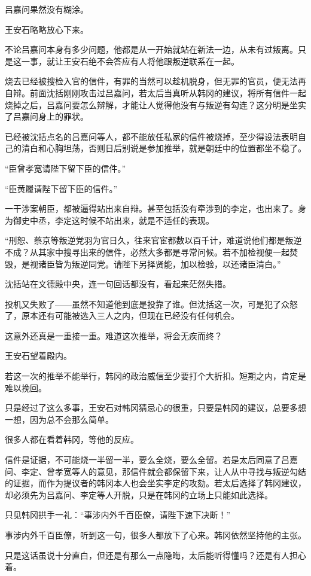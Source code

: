 吕嘉问果然没有糊涂。

王安石略略放心下来。

不论吕嘉问本身有多少问题，他都是从一开始就站在新法一边，从未有过叛离。只是这一事，就让王安石绝不会答应有人将他跟叛逆联系在一起。

烧去已经被搜检入官的信件，有罪的当然可以趁机脱身，但无罪的官员，便无法再自辩。前面沈括刚刚攻击过吕嘉问，若太后当真听从韩冈的建议，将所有信件一起烧掉之后，吕嘉问要怎么辩解，才能让人觉得他没有与叛逆有勾连？这分明是坐实了吕嘉问身上的罪状。

已经被沈括点名的吕嘉问等人，都不能放任私家的信件被烧掉，至少得设法表明自己的清白和心胸坦荡，否则日后别说是参加推举，就是朝廷中的位置都坐不稳了。

“臣曾孝宽请陛下留下臣的信件。”

“臣黄履请陛下留下臣的信件。”

一干涉案朝臣，都被逼得站出来自辩。甚至包括没有牵涉到的李定，也出来了。身为御史中丞，李定这时候不站出来，就是不适任的表现。

“刑恕、蔡京等叛逆党羽为官日久，往来官宦都数以百千计，难道说他们都是叛逆不成？从其家中搜寻出来的信件，必然大多都是寻常问候。若不加检视便一起焚毁，是视诸臣皆为叛逆同党。请陛下另择贤能，加以检验，以还诸臣清白。”

沈括站在文德殿中央，连一句回话都没有，看起来茫然失措。

投机又失败了——虽然不知道他到底是投靠了谁。但沈括这一次，可是犯了众怒了，原本还有可能被选入三人之内，但现在已经没有任何机会。

这意外还真是一重接一重。难道这次推举，将会无疾而终？

王安石望着殿内。

若这一次的推举不能举行，韩冈的政治威信至少要打个大折扣。短期之内，肯定是难以挽回。

只是经过了这么多事，王安石对韩冈猜忌心的很重，只要是韩冈的建议，总要多想一想，因为总不会那么简单。

很多人都在看着韩冈，等他的反应。

信件是证据，不可能烧一半留一半，要么全烧，要么全留。若是太后同意了吕嘉问、李定、曾孝宽等人的意见，那信件就会都保留下来，让人从中寻找与叛逆勾结的证据，而作为提议者的韩冈本人也会坐实李定的攻劾。若太后选择了韩冈建议，却必须先为吕嘉问、李定等人开脱，只是在韩冈的立场上只能如此选择。

只见韩冈拱手一礼：“事涉内外千百臣僚，请陛下速下决断！”

事涉内外千百臣僚，听到这一句，很多人都放下了心来。韩冈依然坚持他的主张。

只是这话虽说十分直白，但还是有那么一点隐晦，太后能听得懂吗？还是有人担心着。

